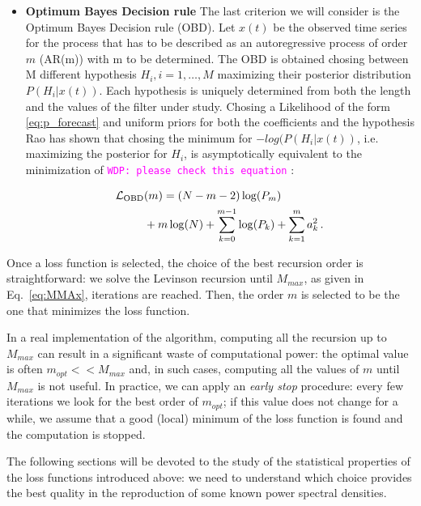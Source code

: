 \documentclass[twocolumn,showpacs,preprintnumbers,nofootinbib,prd,
superscriptaddress,10pt]{revtex4-1}
\newcommand{\wdp}[1]{{\textcolor{magenta}{\texttt{WDP: #1}} }}
\begin{document}
\begin{itemize}
\item \textbf{Optimum Bayes Decision rule} 
The last criterion we will consider is the Optimum Bayes Decision rule (OBD)\cite{doi:10.1029/WR018i004p01097}. Let $x(t)$ be the observed 
time series for the process that has to be described as an autoregressive process of order $m$ (AR(m)) with m to be determined. The OBD is obtained chosing between M different hypothesis $H_i, i = 1, \dots, M$ maximizing their posterior distribution $P(H_i\vert x(t))$. Each
hypothesis is uniquely determined from both the length and the values of the filter under study. Chosing a Likelihood of the form \eqref{eq:p_forecast} and uniform priors for both the coefficients and the hypothesis Rao has shown that chosing the minimum for $-log(P(H_i \vert x(t))$, i.e. maximizing the posterior for $H_i$, is asymptotically equivalent to the minimization of \wdp{please check this equation}: 

   \begin{align}
        \mathcal{L}_{\rm OBD}&(m) = (N - m - 2) \log(P_m) \nonumber\\
        &+ m \log(N) + \sum_{k = 0}^{m-1} \log(P_k) + \sum_{k = 1}^{m} a_k^2\,.
    \end{align}
\end{itemize}

Once a loss function is selected, the choice of the best recursion order is straightforward: we solve the Levinson \cite{doi:10.1002/sapm1946251261} recursion until $M_{max}$, as given in Eq.~\eqref{eq:MMAx}, iterations are reached. Then, the order $m$ is selected to be the one that minimizes the loss function.

In a real implementation of the algorithm, computing all the recursion up to $M_{max}$ can result in a significant waste of computational power: the optimal value is often $m_{opt} << M_{max}$ and, in such cases, computing all the values of $m$ until $M_{max}$ is not useful.
In practice, we can apply an \textit{early stop} procedure: every few iterations we look for the best order of $m_{opt}$; if this value does not change for a while, we assume that a good (local) minimum of the loss function is found and the computation is stopped.

The following sections will be devoted to the study of the statistical properties of the loss functions introduced above: we need to understand which choice provides the best quality in the reproduction of some known power spectral densities. 
\end{document}
